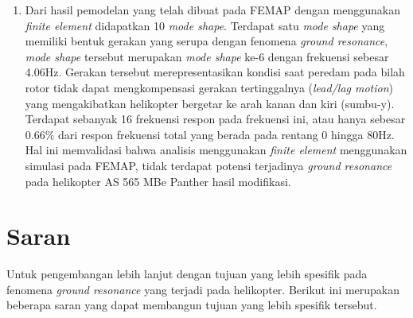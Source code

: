 \begin{enumerate}[nolistsep]
	\item Dari hasil pemodelan yang telah dibuat pada FEMAP dengan menggunakan \textit{finite element} didapatkan 10 \textit{mode shape}. Terdapat satu \textit{mode shape} yang memiliki bentuk gerakan yang serupa dengan fenomena \textit{ground resonance}, \textit{mode shape} tersebut merupakan \textit{mode shape} ke-6 dengan frekuensi sebesar 4.06Hz. Gerakan tersebut merepresentasikan kondisi saat peredam pada bilah rotor tidak dapat mengkompensasi gerakan tertinggalnya (\textit{lead/lag motion}) yang mengakibatkan helikopter bergetar ke arah kanan dan kiri (sumbu-y). Terdapat sebanyak 16 frekuensi respon pada frekuensi ini, atau hanya sebesar 0.66$\%$ dari respon frekuensi total yang berada pada rentang 0 hingga 80Hz. Hal ini memvalidasi bahwa analisis menggunakan \textit{finite element} menggunakan simulasi pada FEMAP, tidak terdapat potensi terjadinya \textit{ground resonance} pada helikopter AS 565 MBe Panther hasil modifikasi.

\end{enumerate}

\section{Saran}
\label{chap:saran}

Untuk pengembangan lebih lanjut dengan tujuan yang lebih spesifik pada fenomena \textit{ground resonance} yang terjadi pada helikopter. Berikut ini merupakan beberapa saran yang dapat membangun tujuan yang lebih spesifik tersebut.


